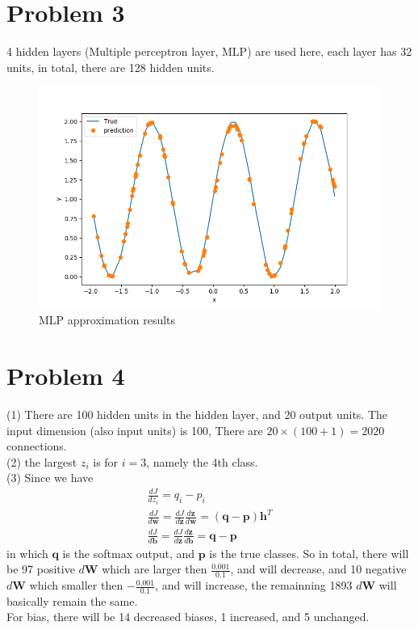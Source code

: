 \documentclass[12pt]{article}
\begin{document}
\section{Problem 3}
4 hidden layers (Multiple perceptron layer, MLP) are used here, each layer has $32$ 
units, in total, there are 128 hidden units.
\begin{figure}[h]
    \centering
    \includegraphics [scale=0.5]{Figure_3.png}
    \caption {MLP approximation results}
\end{figure}

\section{Problem 4}
(1) There are 100 hidden units in the hidden layer, and 20 output
units. The input dimension (also input units) is 100, There are $20\times(100+1)=2020$ connections.\\
(2) the largest $z_i$ is for $i=3$, namely the 4th class.\\
(3) Since we have 
\begin{eqnarray}
    \frac{dJ}{dz_i}=q_i-p_i \\
    \frac{dJ}{d\bm{w}}=\frac{dJ}{d\bm z}\frac{d\bm z}{d\bm w}=(\bm{q-p})\bm{h}^T\\
    \frac{dJ}{d\bm{b}}=\frac{dJ}{d\bm z}\frac{d\bm z}{d\bm b}=\bm{q-p}
\end{eqnarray}
in which $\bm q$ is the softmax output, and $\bm p$ is the true classes. So in
total, there will be 97 positive $d\bm W$ which are larger then
$\frac{0.001}{0.1}$, and will decrease, and 10 negative $d\bm W$ which
smaller then $-\frac{0.001}{0.1}$, and will increase, the remainning
1893 $d\bm W$ will basically remain the same. \\
For bias, there will be 14 decreased biases, 1 increased, and 5
unchanged.
\end{document}
